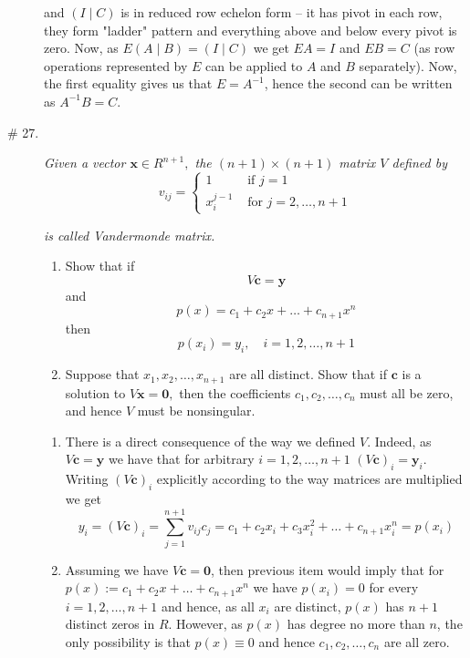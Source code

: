 \documentclass[8pt]{article} %
\begin{document}
\begin{description}
{		and $(I\mid C)$ is in reduced row echelon form -- it has pivot in each row, they form "ladder" pattern and everything above and
		below every pivot is zero. Now, as $E(A\mid B)=(I\mid C)$ we get $EA=I$ and $EB=C$ (as row operations represented by $E$ can
		be applied to $A$ and $B$ separately). Now, the first equality gives us that $E=A^{-1}$, hence the second can be written as
		$A^{-1}B=C$.
		}
	\item[\# 27.]{
		\newcommand{\x}{\mathbf{x}}
		\renewcommand{\c}{\mathbf{c}}
		\newcommand{\y}{\mathbf{y}}
		\newcommand{\z}{\mathbf{0}}
		{\it Given a vector $\x\in R^{n+1},$ the $(n+1)\times (n+1)$ matrix $V$ defined by}
		\[v_{ij}=\begin{cases}1 & \mbox{ if }j=1\\x_i^{j-1} & \mbox{ for } j=2,\dots,n+1\end{cases}\]
		{\it is called Vandermonde matrix.
		\begin{enumerate}[label=(\alph*)]
			\item Show that if \[V\c=\y\] and \[p(x)=c_1+c_2x+\dots+c_{n+1}x^n\] then \[p(x_i)=y_i,\quad i=1,2,\dots,n+1\]
			\item Suppose that $x_1,x_2,\dots,x_{n+1}$ are all distinct. Show that if $\c$ is a solution to $V\x=\z,$ then the
				coefficients $c_1,c_2,\dots,c_n$ must all be zero, and hence $V$ must be nonsingular.
		\end{enumerate}
		}
		\begin{enumerate}[label=(\alph*)]
			\item There is a direct consequence of the way we defined $V$. Indeed, as $V\c=\y$ we have that for arbitrary $i=1,2,\dots,
				n+1$ $(V\c)_i=\y_i$. Writing $(V\c)_i$ explicitly according to the way matrices are multiplied we get
				\[y_i=(V\c)_i=\sum_{j=1}^{n+1}v_{ij}c_j=c_1+c_2x_i+c_3x_i^2+\dots+c_{n+1}x_i^n=p(x_i)\]
			\item Assuming we have $V\c=\z$, then previous item would imply that for $p(x):=c_1+c_2x+\dots+c_{n+1}x^n$ we have
				$p(x_i)=0$ for every $i=1,2,\dots,n+1$ and hence, as all $x_i$ are distinct, $p(x)$ has $n+1$ distinct zeros
				in $R$. However, as $p(x)$ has degree no more than $n$, the only possibility is that $p(x)\equiv 0$ and hence
				$c_1,c_2,\dots,c_n$ are all zero.
		\end{enumerate}
		}
	\end{description}
\end{document}
